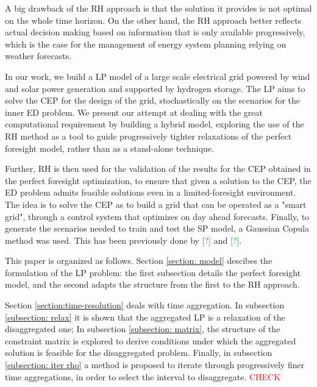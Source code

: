 A big drawback of the RH approach is that the solution it provides is not optimal on the whole time horizon. 
On the other hand, the RH approach better reflects actual decision making based on information that is only available progressively, which is the case for the management of energy system planning relying on weather forecasts.

In our work, we build a LP model of a large scale electrical grid powered by wind and solar power generation and supported by hydrogen storage. 
The LP aims to solve the CEP for the design of the grid, stochastically on the scenarios for the inner ED problem. 
We present our attempt at dealing with the great computational requirement by building a hybrid model, exploring the use of the RH method as a tool to guide progressively tighter relaxations of the perfect foresight model, rather than as a stand-alone technique. 

Further, RH is then used for the validation of the results for the CEP obtained in the perfect foresight optimization, to ensure that given a solution to the CEP, the ED problem admits feasible solutions even in a limited-foresight environment. 
The idea is to solve the CEP as to build a grid that can be operated as a "smart grid", through a control system that optimizes on day ahead forecasts.
{
\color{gray}
Finally, to generate the scenarios needed to train and test the SP model, a Gaussian Copula method was used. 
This has been previously done by \textcolor{green}{[?]} and \textcolor{green}{[?]}.
}

\color{black}

This paper is organized as follows. 
Section \ref{section: model} descibes the formulation of the LP problem: the first subsection details the perfect foresight model, and the second adapts the structure from the first to the RH approach. 

Section \ref{section:time-resolution} deals with time aggregation. In subsection \ref{subsection: relax} it is shown that the aggregated LP is a relaxation of the disaggregated one; 
In subsection \ref{subsection: matrix}, the structure of the constraint matrix is explored to derive conditions under which the aggregated solution is feasible for the disaggregated problem. 
Finally, in subsection \ref{subsection: iter rho} a method is proposed to iterate through progressively finer time aggregations, in order to select the interval to disaggregate. 
\textcolor{red}{CHECK}


